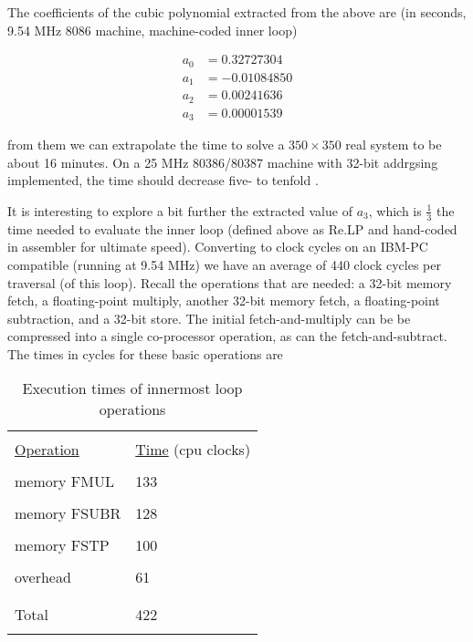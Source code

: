 The coefficients of the cubic polynomial extracted from the above
are (in seconds, 9.54 MHz 8086 machine, machine-coded inner loop)

\begin{equation*}
    \begin{split}
        a_0 &= 0.32727304\\
        a_1 &= -0.01084850\\
        a_2 &= 0.00241636\\
        a_3 &= 0.00001539
    \end{split}
\end{equation*}

from them we can extrapolate the time to solve a $350 \times 350$ real
system to be about 16 minutes. On a 25 MHz 80386/80387 machine with 32-bit addrgsing implemented, the time should
decrease five- to tenfold .

It is interesting to explore a bit further the extracted value of $a_3$,
which is $\frac{1}{3}$ the time needed to evaluate the inner loop (defined
above as Re.LP and hand-coded in assembler for ultimate
speed). Converting to clock cycles on an IBM-PC compatible
(running at 9.54 MHz) we have an average of 440 clock cycles per
traversal (of this loop). Recall the operations that are needed: a
32-bit memory fetch, a floating-point multiply, another 32-bit
memory fetch, a floating-point subtraction, and a 32-bit store.
The initial fetch-and-multiply can be be compressed into a single
co-processor operation, as can the fetch-and-subtract. The times
in cycles for these basic operations are
\begin{table}
    \centering
    \caption{Execution times of innermost loop operations}
        \bigskip
    \label{tbl:09_02} 
    \setlength{\tabcolsep}{10pt}
        \begin{tabular}{|ll|}
            \hline &  \\
            \underline{Operation} & \underline{Time} \; (cpu clocks)\\
            &  \\
            memory FMUL &  133  \\
            &  \\
            memory FSUBR &  128  \\
            &  \\
            memory FSTP &  100  \\ 
            &  \\
            overhead &  61  \\ 
            &  \\
            \hline &  \\
            Total &  422  \\ 
            &  \\
            \hline
        \end{tabular}
\end{table}
 
